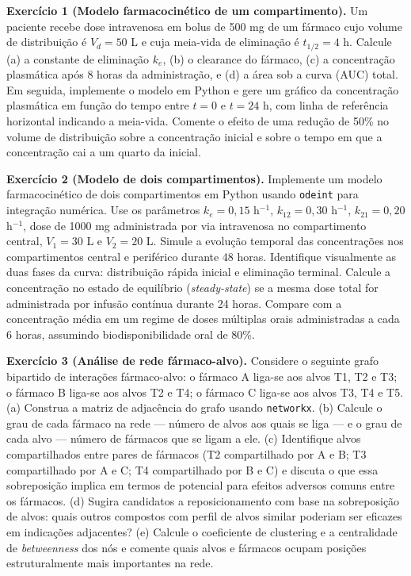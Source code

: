 \textbf{Exercício 1 (Modelo farmacocinético de um compartimento).} Um paciente recebe dose intravenosa em bolus de 500 mg de um fármaco cujo volume de distribuição é $V_d = 50$ L e cuja meia-vida de eliminação é $t_{1/2} = 4$ h. Calcule (a) a constante de eliminação $k_e$, (b) o clearance do fármaco, (c) a concentração plasmática após 8 horas da administração, e (d) a área sob a curva (AUC) total. Em seguida, implemente o modelo em Python e gere um gráfico da concentração plasmática em função do tempo entre $t=0$ e $t=24$ h, com linha de referência horizontal indicando a meia-vida. Comente o efeito de uma redução de 50\% no volume de distribuição sobre a concentração inicial e sobre o tempo em que a concentração cai a um quarto da inicial.

\textbf{Exercício 2 (Modelo de dois compartimentos).} Implemente um modelo farmacocinético de dois compartimentos em Python usando \texttt{odeint} para integração numérica. Use os parâmetros $k_e = 0{,}15$ h$^{-1}$, $k_{12} = 0{,}30$ h$^{-1}$, $k_{21} = 0{,}20$ h$^{-1}$, dose de 1000 mg administrada por via intravenosa no compartimento central, $V_1 = 30$ L e $V_2 = 20$ L. Simule a evolução temporal das concentrações nos compartimentos central e periférico durante 48 horas. Identifique visualmente as duas fases da curva: distribuição rápida inicial e eliminação terminal. Calcule a concentração no estado de equilíbrio (\emph{steady-state}) se a mesma dose total for administrada por infusão contínua durante 24 horas. Compare com a concentração média em um regime de doses múltiplas orais administradas a cada 6 horas, assumindo biodisponibilidade oral de 80\%.

\textbf{Exercício 3 (Análise de rede fármaco-alvo).} Considere o seguinte grafo bipartido de interações fármaco-alvo: o fármaco A liga-se aos alvos T1, T2 e T3; o fármaco B liga-se aos alvos T2 e T4; o fármaco C liga-se aos alvos T3, T4 e T5. (a) Construa a matriz de adjacência do grafo usando \texttt{networkx}. (b) Calcule o grau de cada fármaco na rede --- número de alvos aos quais se liga --- e o grau de cada alvo --- número de fármacos que se ligam a ele. (c) Identifique alvos compartilhados entre pares de fármacos (T2 compartilhado por A e B; T3 compartilhado por A e C; T4 compartilhado por B e C) e discuta o que essa sobreposição implica em termos de potencial para efeitos adversos comuns entre os fármacos. (d) Sugira candidatos a reposicionamento com base na sobreposição de alvos: quais outros compostos com perfil de alvos similar poderiam ser eficazes em indicações adjacentes? (e) Calcule o coeficiente de clustering e a centralidade de \emph{betweenness} dos nós e comente quais alvos e fármacos ocupam posições estruturalmente mais importantes na rede.

